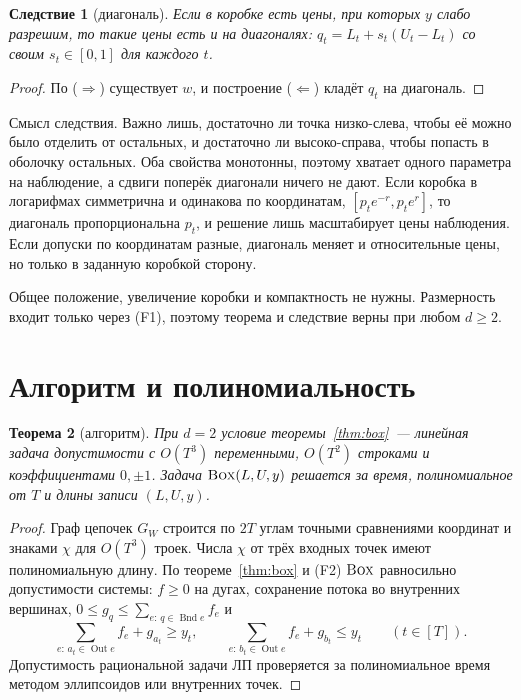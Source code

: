 \documentclass[a4paper,11pt]{article}
\theoremstyle{plain}
\newtheorem{theorem}{Теорема}[section]
\newtheorem{corollary}[theorem]{Следствие}
\theoremstyle{definition}
\theoremstyle{remark}
\DeclareMathOperator{\Out}{Out}
\DeclareMathOperator{\Bnd}{Bnd}
\newcommand{\BOX}{\textup{\textsc{Box}}}
\begin{document}
\begin{corollary}[диагональ]\label{cor:diag}
    Если в коробке есть цены, при которых $y$ слабо разрешим, то такие цены есть и на диагоналях: $q_t=L_t+s_t(U_t-L_t)$ со своим $s_t\in[0,1]$ для каждого $t$.
\end{corollary}

\begin{proof}
    По ($\Rightarrow$) существует $w$, и построение ($\Leftarrow$) кладёт $q_t$ на диагональ.
\end{proof}

Смысл следствия. Важно лишь, достаточно ли точка низко-слева, чтобы её можно было отделить от остальных, и достаточно ли высоко-справа, чтобы попасть в оболочку остальных. Оба свойства монотонны, поэтому хватает одного параметра на наблюдение, а сдвиги поперёк диагонали ничего не дают. Если коробка в логарифмах симметрична и одинакова по координатам, $[p_te^{-r},p_te^{r}]$, то диагональ пропорциональна $p_t$, и решение лишь масштабирует цены наблюдения. Если допуски по координатам разные, диагональ меняет и относительные цены, но только в заданную коробкой сторону.

Общее положение, увеличение коробки и компактность не нужны. Размерность входит только через (F1), поэтому теорема и следствие верны при любом $d\ge2$.

\section{Алгоритм и полиномиальность}\label{sec:alg}

\begin{theorem}[алгоритм]\label{thm:alg}
    При $d=2$ условие теоремы~\ref{thm:box}~--- линейная задача допустимости с $O(T^3)$ переменными, $O(T^2)$ строками и коэффициентами $0,\pm1$. Задача $\BOX(L,U,y)$ решается за время, полиномиальное от $T$ и длины записи $(L,U,y)$.
\end{theorem}

\begin{proof}
    Граф цепочек $G_W$ строится по $2T$ углам точными сравнениями координат и знаками $\chi$ для $O(T^3)$ троек. Числа $\chi$ от трёх входных точек имеют полиномиальную длину. По теореме~\ref{thm:box} и (F2) $\BOX$ равносильно допустимости системы: $f\ge0$ на дугах, сохранение потока во внутренних вершинах, $0\le g_q\le\sum_{e:\,q\in\Bnd e}f_e$ и
    \[
        \sum_{e:\,a_t\in\Out e}f_e+g_{a_t}\ge y_t,\qquad
        \sum_{e:\,b_t\in\Out e}f_e+g_{b_t}\le y_t\qquad(t\in[T]).
    \]
    Допустимость рациональной задачи ЛП проверяется за полиномиальное время методом эллипсоидов или внутренних точек.
\end{proof}
\end{document}
